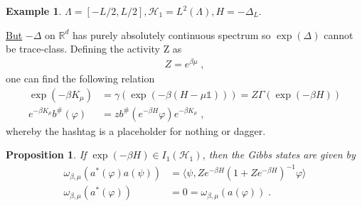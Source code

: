 \documentclass[
a4paper, %
11pt, %
onecolumn, %
openany, %
]{memoir}
\theoremstyle{definition}
\newtheorem{example}{Example}[chapter]
\theoremstyle{remark}
\theoremstyle{plain}
\newtheorem{prop}{Proposition}[chapter]
\begin{document}
\begin{example}
	$\Lambda=[-L/2,L/2], \mathcal{H}_1=L^2(\Lambda), H=-\Delta_L$.
\end{example}
\underline{But} $-\Delta$ on $\mathbb{R}^d$ has purely absolutely continuous spectrum so $\exp(\Delta)$ cannot be trace-class. Defining the activity Z as \begin{align}
Z=e^{\beta\mu}\; ,
\end{align}
one can find the following relation \begin{align}
\exp(-\beta K_{\mu})&=\gamma(\exp(-\beta(H-\mu\mathds{1})))=Z\Gamma(\exp(-\beta H))\\
e^{-\beta K_{\mu}}b^{\#}(\varphi)&=zb^{\#}(e^{-\beta H}\varphi)e^{-\beta K_{\mu}}\label{eqn::hashtag_dat_shit}\; ,
\end{align}
whereby the hashtag is a placeholder for nothing or dagger.
\begin{prop}
	If $\exp(-\beta H)\in I_1(\mathcal{H}_1)$, then the Gibbs states are given by\begin{align}
	\omega_{\beta,\mu}(a^{*}(\varphi)a(\psi))&=\langle \psi, Ze^{-\beta H}(1+Ze^{-\beta H})^{-1}\varphi\rangle\\
	\omega_{\beta,\mu}(a^*(\varphi))&=0=\omega_{\beta,\mu}(a(\varphi))\; .
	\end{align}
\end{prop}
\end{document}

